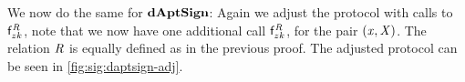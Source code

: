 We now do the same for $\mathbf{dAptSign}$:
Again we adjust the protocol with calls to $\mathsf{f}^{\mathit{R}}_{zk}$, note that we now have one additional call $\mathsf{f}^{\mathit{R}}_{zk}$, for the pair $(\mathit{x}, \mathit{X})$.
The relation $\mathit{R}$ is equally defined as in the previous proof.
The adjusted protocol can be seen in \cref{fig:sig:daptsign-adj}.
\begin{figure}
    \begin{center}
\end{center}
\end{figure}
